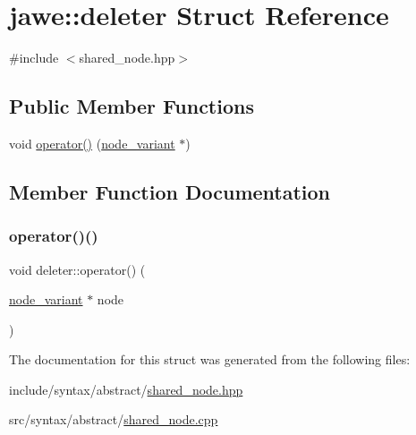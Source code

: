 \hypertarget{structjawe_1_1deleter}{}\section{jawe\+:\+:deleter Struct Reference}
\label{structjawe_1_1deleter}


{\ttfamily \#include $<$shared\+\_\+node.\+hpp$>$}

\subsection*{Public Member Functions}
\begin{DoxyCompactItemize}
\item 
void \hyperlink{structjawe_1_1deleter_ae05c400e87fe22be199bc4ed2d38a882}{operator()} (\hyperlink{namespacejawe_aca98f97d61e437678e7478e2d8aaf41f}{node\+\_\+variant} $\ast$)
\end{DoxyCompactItemize}


\subsection{Member Function Documentation}
\mbox{\label{structjawe_1_1deleter_ae05c400e87fe22be199bc4ed2d38a882}} 
\subsubsection{\texorpdfstring{operator()()}{operator()()}}
{\footnotesize\ttfamily void deleter\+::operator() (\begin{DoxyParamCaption}\item[{\hyperlink{namespacejawe_aca98f97d61e437678e7478e2d8aaf41f}{node\+\_\+variant} $\ast$}]{node }\end{DoxyParamCaption})}



The documentation for this struct was generated from the following files\+:\begin{DoxyCompactItemize}
\item 
include/syntax/abstract/\hyperlink{shared__node_8hpp}{shared\+\_\+node.\+hpp}\item 
src/syntax/abstract/\hyperlink{shared__node_8cpp}{shared\+\_\+node.\+cpp}\end{DoxyCompactItemize}
